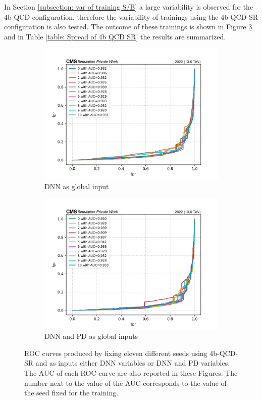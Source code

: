 In Section \ref{subsection: var of training S/B} a large variability is observed for the 4b-QCD configuration, therefore the variability of trainings using the 4b-QCD-SR configuration is also tested. The outcome of these trainings is shown in Figure \ref{fig: 4b QCD SR variability} and in Table \ref{table: Spread of 4b QCD SR} the results are summarized. 

\begin{figure}[hbt]
\centering
\begin{subfigure}{.5\textwidth}
  \centering
  \includegraphics[width=1.1\linewidth]{Images/7.S:B/Variability/4b QCD sr dnn.png}
  \caption{DNN as global input}
  \label{fig: 4b QCD SR DNN}
\end{subfigure}%
\begin{subfigure}{.5\textwidth}
  \centering
  \includegraphics[width=1.1\linewidth]{Images/7.S:B/Variability/4b QCD sr dnn + prob diff.png}
  \caption{DNN and PD as global inputs}
  \label{fig: 4b QCD SR DNN PD}
\end{subfigure}
\caption{ROC curves produced by fixing eleven different seeds using 4b-QCD-SR and as inputs either DNN variables or DNN and PD variables. The AUC of each ROC curve are also reported in these Figures. The number next to the value of the AUC corresponds to the value of the seed fixed for the training.}
\label{fig: 4b QCD SR variability}
\end{figure}

